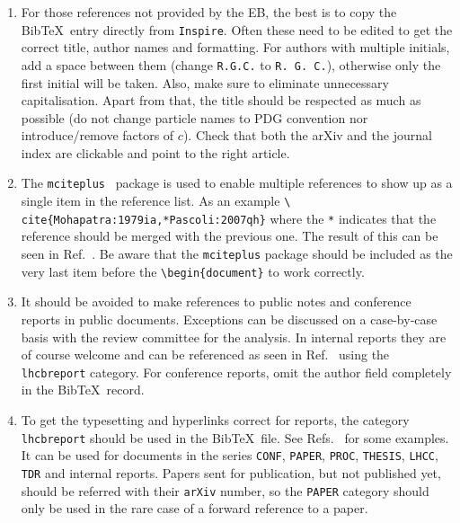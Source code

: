 \begin{enumerate}
\item For those references not provided by the EB, the best
  is to copy the Bib\TeX\ entry directly from
  \texttt{Inspire}. Often these need to be edited to get the 
  correct title, author names and formatting. 
  For authors with multiple initials, add a space between them (change \texttt{R.G.C.} to \texttt{R. G. C.}),
  otherwise only the first initial will be taken. 
  Also, make sure to eliminate unnecessary capitalisation.
  Apart from that, the title should be respected as much as possible
  (\eg do not change particle names to PDG convention nor introduce/remove factors of $c$).
  Check that both the arXiv and the journal index are clickable
  and point to the right article.


\item The \texttt{mciteplus}~\cite{mciteplus} package is used
  to enable multiple references to show up as a single item in the
  reference list. As an example \texttt{\textbackslash
    cite\{Mohapatra:1979ia,*Pascoli:2007qh\}} where the \texttt{*}
  indicates that the reference should be merged with the previous
  one. The result of this can be seen in
  Ref.~\cite{Mohapatra:1979ia,*Pascoli:2007qh}. Be aware that the
  \texttt{mciteplus} package should be included as the very last item
  before the \texttt{\textbackslash begin\{document\}} to work
  correctly.

\item It should be avoided to make references to public notes and
  conference reports in public documents. Exceptions can be discussed
  on a case-by-case basis with the review committee for the
  analysis. In internal reports they are of course welcome and can be
  referenced as seen in Ref.~\cite{LHCb-CONF-2011-003} using the
  \texttt{lhcbreport} category. For conference reports, omit the
  author field completely in the Bib\TeX\ record.

\item To get the typesetting and hyperlinks correct for \lhcb reports,
  the category \texttt{lhcbreport} should be used in the Bib\TeX\
  file. See Refs.~\cite{LHCb-INT-2011-047, *LHCb-ANA-2011-078,
    *CERN-THESIS-2014-057, *LHCb-PROC-2014-017, *LHCB-TALK-2014-257}
  for some examples. It can be used for \lhcb documents in the series
  \texttt{CONF}, \texttt{PAPER}, \texttt{PROC}, \texttt{THESIS},
  \texttt{LHCC}, \texttt{TDR} and internal \lhcb reports. Papers sent
  for publication, but not published yet, should be referred with
  their \texttt{arXiv} number, so the \texttt{PAPER} category should
  only be used in the rare case of a forward reference to a paper.


\end{enumerate}
